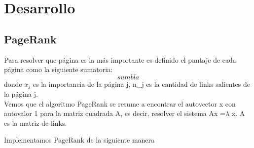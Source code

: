 \section{Desarrollo}

\subsection{PageRank}

Para resolver que página es la más importante es definido el puntaje de cada página como la siguiente sumatoria:
	$$ sum bla$$
donde $x_{j}$ es la importancia de la página j, n_{j} es la cantidad de links salientes de la página j.\\

Vemos que el algoritmo PageRank se resume a encontrar el autovector x con autovalor 1 para la matriz cuadrada A, es decir, resolver el sistema Ax =$\lambda$ x. A es la matriz de links.

Implementamos PageRank de la siguiente manera





